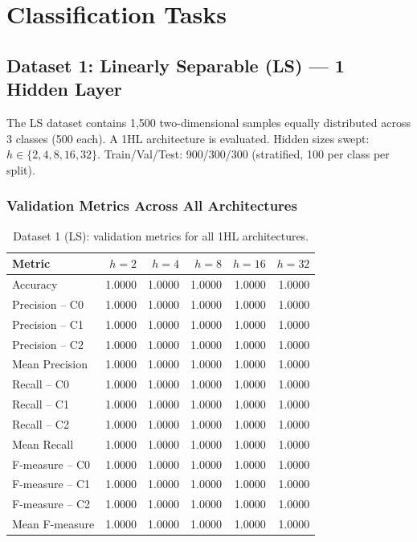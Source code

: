 \documentclass[11pt,a4paper]{article}
\begin{document}
\section{Classification Tasks}

\subsection{Dataset 1: Linearly Separable (LS) --- 1 Hidden Layer}

The LS dataset contains 1,500 two-dimensional samples equally distributed across 3 classes (500 each). A 1HL architecture is evaluated. Hidden sizes swept: $h \in \{2,4,8,16,32\}$. Train/Val/Test: 900/300/300 (stratified, 100 per class per split).

\subsubsection*{Validation Metrics Across All Architectures}

\begin{table}[H]
\centering
\caption{Dataset 1 (LS): validation metrics for all 1HL architectures.}
\label{tab:ls-val-metrics}
\small
\begin{tabular}{lrrrrr}
\toprule
Metric & $h=2$ & $h=4$ & $h=8$ & $h=16$ & $h=32$ \\
\midrule
Accuracy        & 1.0000 & 1.0000 & 1.0000 & 1.0000 & 1.0000 \\
Precision -- C0 & 1.0000 & 1.0000 & 1.0000 & 1.0000 & 1.0000 \\
Precision -- C1 & 1.0000 & 1.0000 & 1.0000 & 1.0000 & 1.0000 \\
Precision -- C2 & 1.0000 & 1.0000 & 1.0000 & 1.0000 & 1.0000 \\
Mean Precision  & 1.0000 & 1.0000 & 1.0000 & 1.0000 & 1.0000 \\
Recall -- C0    & 1.0000 & 1.0000 & 1.0000 & 1.0000 & 1.0000 \\
Recall -- C1    & 1.0000 & 1.0000 & 1.0000 & 1.0000 & 1.0000 \\
Recall -- C2    & 1.0000 & 1.0000 & 1.0000 & 1.0000 & 1.0000 \\
Mean Recall     & 1.0000 & 1.0000 & 1.0000 & 1.0000 & 1.0000 \\
F-measure -- C0 & 1.0000 & 1.0000 & 1.0000 & 1.0000 & 1.0000 \\
F-measure -- C1 & 1.0000 & 1.0000 & 1.0000 & 1.0000 & 1.0000 \\
F-measure -- C2 & 1.0000 & 1.0000 & 1.0000 & 1.0000 & 1.0000 \\
Mean F-measure  & 1.0000 & 1.0000 & 1.0000 & 1.0000 & 1.0000 \\
\bottomrule
\end{tabular}
\end{table}
\end{document}
